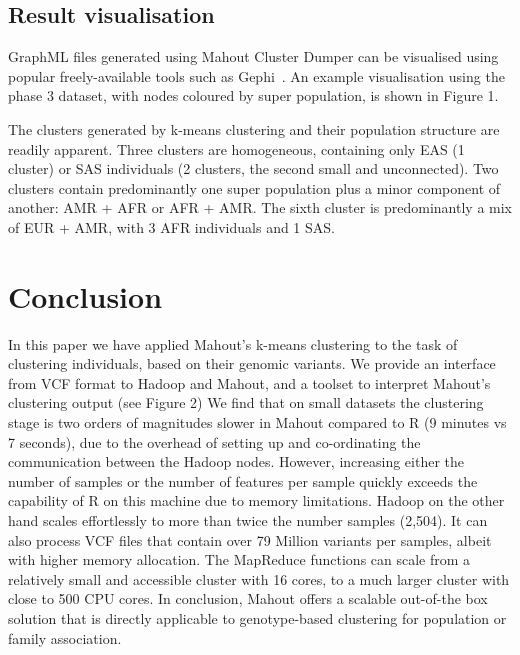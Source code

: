 \documentclass{bioinfo}
\begin{document}
\subsection*{Result visualisation}
GraphML files generated using Mahout Cluster Dumper can be visualised using popular freely-available tools such as Gephi~\cite{ICWSM09154}. An example visualisation using the phase 3 dataset, with nodes coloured by super population, is shown in Figure 1.

The clusters generated by k-means clustering and their population structure are readily apparent. Three clusters are homogeneous, containing only EAS (1 cluster) or SAS individuals (2 clusters, the second small and unconnected). Two clusters contain predominantly one super population plus a minor component of another: AMR + AFR or AFR + AMR. The sixth cluster is predominantly a mix of EUR + AMR, with 3 AFR individuals and 1 SAS.



\section*{Conclusion}
In this paper we have applied Mahout's k-means clustering to the task of clustering individuals, based on their genomic variants. 
We provide an interface from VCF format to Hadoop and Mahout, and a toolset to interpret Mahout's clustering output (see Figure 2)
We find that on small datasets the clustering stage is two orders of magnitudes slower in Mahout compared to R (9 minutes vs 7 seconds), due to the overhead of setting up and co-ordinating the communication between the Hadoop nodes. 
However, increasing either the number of samples or the number of features per sample quickly exceeds the capability of R on this machine due to memory limitations.
Hadoop on the other hand scales effortlessly to more than twice the number samples (2,504). It can also process VCF files that contain over 79 Million variants per samples, albeit with higher memory allocation.
The MapReduce functions can scale from a relatively small and accessible cluster with 16 cores, to a much larger cluster with close to 500 CPU cores. 
In conclusion, Mahout offers a scalable out-of-the box solution that is directly applicable to genotype-based clustering for population or family association. 
\end{document}
